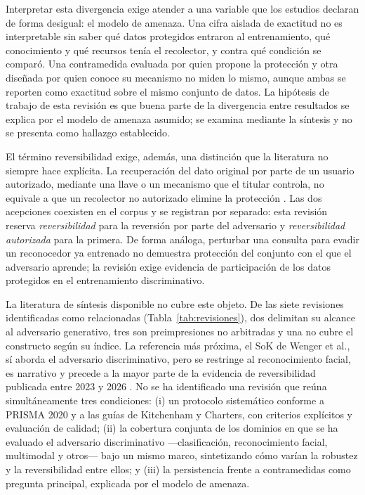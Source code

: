 \documentclass[pdflatex,sn-mathphys-num]{sn-jnl}
\theoremstyle{thmstyleone}
\theoremstyle{thmstyletwo}
\theoremstyle{thmstylethree}
\begin{document}
Interpretar esta divergencia exige atender a una variable que los estudios declaran de forma desigual: el modelo de amenaza. Una cifra aislada de exactitud no es interpretable sin saber qué datos protegidos entraron al entrenamiento, qué conocimiento y qué recursos tenía el recolector, y contra qué condición se comparó. Una contramedida evaluada por quien propone la protección y otra diseñada por quien conoce su mecanismo no miden lo mismo, aunque ambas se reporten como exactitud sobre el mismo conjunto de datos. La hipótesis de trabajo de esta revisión es que buena parte de la divergencia entre resultados se explica por el modelo de amenaza asumido; se examina mediante la síntesis y no se presenta como hallazgo establecido.

El término reversibilidad exige, además, una distinción que la literatura no siempre hace explícita. La recuperación del dato original por parte de un usuario autorizado, mediante una llave o un mecanismo que el titular controla, no equivale a que un recolector no autorizado elimine la protección \cite{wang2026reversible}. Las dos acepciones coexisten en el corpus y se registran por separado: esta revisión reserva \emph{reversibilidad} para la reversión por parte del adversario y \emph{reversibilidad autorizada} para la primera. De forma análoga, perturbar una consulta para evadir un reconocedor ya entrenado no demuestra protección del conjunto con el que el adversario aprende; la revisión exige evidencia de participación de los datos protegidos en el entrenamiento discriminativo.

La literatura de síntesis disponible no cubre este objeto. De las siete revisiones identificadas como relacionadas (Tabla~\ref{tab:revisiones}), dos delimitan su alcance al adversario generativo, tres son preimpresiones no arbitradas y una no cubre el constructo según su índice. La referencia más próxima, el SoK de Wenger et al., sí aborda el adversario discriminativo, pero se restringe al reconocimiento facial, es narrativo y precede a la mayor parte de la evidencia de reversibilidad publicada entre 2023 y 2026 \cite{wenger2023sok}. No se ha identificado una revisión que reúna simultáneamente tres condiciones: (i) un protocolo sistemático conforme a PRISMA 2020 y a las guías de Kitchenham y Charters, con criterios explícitos y evaluación de calidad; (ii) la cobertura conjunta de los dominios en que se ha evaluado el adversario discriminativo ---clasificación, reconocimiento facial, multimodal y otros--- bajo un mismo marco, sintetizando cómo varían la robustez y la reversibilidad entre ellos; y (iii) la persistencia frente a contramedidas como pregunta principal, explicada por el modelo de amenaza.
\end{document}

